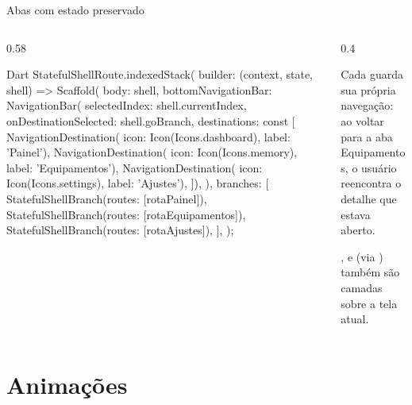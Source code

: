 \documentclass[aspectratio=169,10pt]{beamer}
\begin{document}
\begin{frame}[fragile]{Abas com estado preservado}
  \begin{columns}[T]
    \begin{column}{0.58\textwidth}
\begin{codigo}[title=StatefulShellRoute]{Dart}
StatefulShellRoute.indexedStack(
  builder: (context, state, shell) => Scaffold(
    body: shell,
    bottomNavigationBar: NavigationBar(
      selectedIndex: shell.currentIndex,
      onDestinationSelected: shell.goBranch,
      destinations: const [
        NavigationDestination(
            icon: Icon(Icons.dashboard), label: 'Painel'),
        NavigationDestination(
            icon: Icon(Icons.memory), label: 'Equipamentos'),
        NavigationDestination(
            icon: Icon(Icons.settings), label: 'Ajustes'),
      ]),
  ),
  branches: [
    StatefulShellBranch(routes: [rotaPainel]),
    StatefulShellBranch(routes: [rotaEquipamentos]),
    StatefulShellBranch(routes: [rotaAjustes]),
  ],
);
\end{codigo}
    \end{column}
    \begin{column}{0.4\textwidth}
      \begin{conceito}
        Cada  guarda sua própria navegação: ao voltar para a aba Equipamentos, o usuário reencontra o detalhe que estava aberto.
      \end{conceito}
      \begin{dica}
        ,  e  (via ) também são camadas sobre a tela atual.
      \end{dica}
    \end{column}
  \end{columns}
\end{frame}

\section{Animações}
\end{document}
